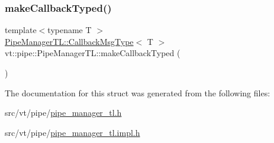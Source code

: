 \mbox{\label{structvt_1_1pipe_1_1_pipe_manager_t_l_a9644742f82b43a851e8a20755302a2e0}} 
\subsubsection{\texorpdfstring{make\+Callback\+Typed()}{makeCallbackTyped()}}
{\footnotesize\ttfamily template$<$typename T $>$ \\
\hyperlink{structvt_1_1pipe_1_1_pipe_manager_t_l_af6fc2c17f1729fa06450441b0ee81cb1}{Pipe\+Manager\+T\+L\+::\+Callback\+Msg\+Type}$<$ T $>$ vt\+::pipe\+::\+Pipe\+Manager\+T\+L\+::make\+Callback\+Typed (\begin{DoxyParamCaption}{ }\end{DoxyParamCaption})}



The documentation for this struct was generated from the following files\+:\begin{DoxyCompactItemize}
\item 
src/vt/pipe/\hyperlink{pipe__manager__tl_8h}{pipe\+\_\+manager\+\_\+tl.\+h}\item 
src/vt/pipe/\hyperlink{pipe__manager__tl_8impl_8h}{pipe\+\_\+manager\+\_\+tl.\+impl.\+h}\end{DoxyCompactItemize}

